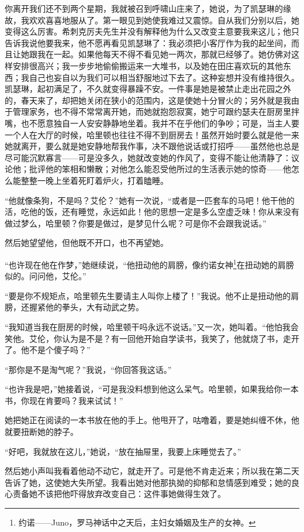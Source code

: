 \par 你离开我们还不到两个星期，我就被召到呼啸山庄来了，她说，为了凯瑟琳的缘故，我欢欢喜喜地服从了。第一眼见到她使我难过又震惊。自从我们分别以后，她变得这么厉害。希刺克厉夫先生并没有解释他为什么又改变主意要我来这儿；他只告诉我说他要我来，他不愿再看见凯瑟琳了：我必须把小客厅作为我的起坐间，而且让她跟我在一起。如果他每天不得不看见她一两次，那就已经够了。她仿佛对这样安排很高兴；我一步步地偷偷搬运来一大堆书，以及她在田庄喜欢玩的其他东西；我自己也妄自以为我们可以相当舒服地过下去了。这种妄想并没有维持很久。凯瑟琳，起初满足了，不久就变得暴躁不安。一件事是她是被禁止走出花园之外的，春天来了，却把她关闭在狭小的范围内，这是使她十分冒火的；另外就是我由于管理家务，也不得不常常离开她，而她就抱怨寂寞，她宁可跟约瑟夫在厨房里拌嘴，也不愿意独自一人安安静静地坐着。我并不在乎他们的争吵；可是，当主人要一个人在大厅的时候，哈里顿也往往不得不到厨房去！虽然开始时要么就是他一来她就离开，要么就是她安静地帮我作事，决不跟他说话或打招呼——虽然他也总是尽可能沉默寡言——可是没多久，她就改变她的作风了，变得不能让他清静了：议论他；批评他的笨相和懒散；对他怎么能忍受他所过的生活表示她的惊奇——他怎么能整整一晚上坐着死盯着炉火，打着瞌睡。
\par “他就像条狗，不是吗？艾伦？”她有一次说，“或者是一匹套车的马吧！他干他的活，吃他的饭，还有睡觉，永远如此！他的思想一定是多么空虚乏味！你从来没有做过梦么，哈里顿？你要是做过，是梦见什么呢？可是你不会跟我说话。”
\par 然后她望望他，但他既不开口，也不再望她。
\par “也许现在他在作梦，”她继续说，“他扭动他的肩膀，像约诺女神\footnote{约诺——Juno，罗马神话中之天后，主妇女婚姻及生产的女神。}在扭动她的肩膀似的。问问他，艾伦。”
\par “要是你不规矩点，哈里顿先生要请主人叫你上楼了！”我说。他不止是扭动他的肩膀，还握紧他的拳头，大有动武之势。
\par “我知道当我在厨房的时候，哈里顿干吗永远不说话。”又一次，她叫着。“他怕我会笑他。艾伦，你认为是不是？有一回他开始自学读书，我笑了，他就烧了书，走开了。他不是个傻子吗？”
\par “那你是不是淘气呢？”我说，“你回答我这话。”
\par “也许我是吧，”她接着说，“可是我没料想到他这么呆气。哈里顿，如果我给你一本书，你现在肯要吗？我来试试！”
\par 她把她正在阅读的一本书放在他的手上。他甩开了，咕噜着，要是她纠缠不休，他就要扭断她的脖子。
\par “好吧，我就放在这儿，”她说，“放在抽屉里，我要上床睡觉去了。”
\par 然后她小声叫我看着他动不动它，就走开了。可是他不肯走近来；所以我在第二天告诉了她，这使她大失所望。我看出她对他那执拗的抑郁和怠情感到难受；她的良心责备她不该把他吓得放弃改变自己：这件事她做得生效了。
